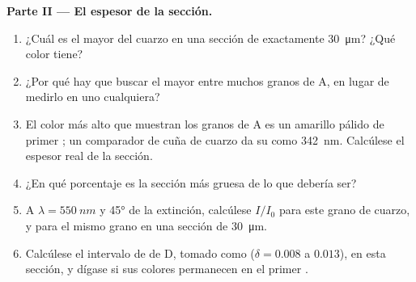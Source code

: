 \begin{problem}
\medskip
\noindent\textbf{Parte II --- El espesor de la sección.}
\begin{enumerate}[resume]
  \item ¿Cuál es el mayor  del cuarzo en una sección de exactamente \qty{30}{\micro m}? ¿Qué color tiene?
  \item ¿Por qué hay que buscar el mayor  entre muchos granos de A, en lugar de medirlo en uno cualquiera?
  \item El color más alto que muestran los granos de A es un amarillo pálido de primer ; un comparador de cuña de cuarzo
        da su  como \qty{342}{nm}. Calcúlese el espesor real de la sección.
  \item ¿En qué porcentaje es la sección más gruesa de lo que debería ser?
  \item A $\lambda = \qty{550}{nm}$ y \ang{45} de la extinción, calcúlese $I/I_0$ para este grano de cuarzo, y para el mismo
        grano en una sección de \qty{30}{\micro m}.
  \item Calcúlese el intervalo de  de D, tomado como  ($\delta = 0.008$ a $0.013$), en esta sección, y
        dígase si sus colores permanecen en el primer .
\end{enumerate}


\end{problem}
